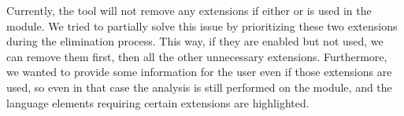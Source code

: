 \documentclass[main.tex]{subfiles}
\begin{document}
	Currently, the tool will not remove any extensions if either  or  is used in the module. We tried to partially solve this issue by prioritizing these two extensions during the elimination process. This way, if they are enabled but not used, we can remove them first, then all the other unnecessary extensions. Furthermore, we wanted to provide some information for the user even if those extensions are used, so even in that case the analysis is still performed on the module, and the language elements requiring certain extensions are highlighted.

		
\end{document}
